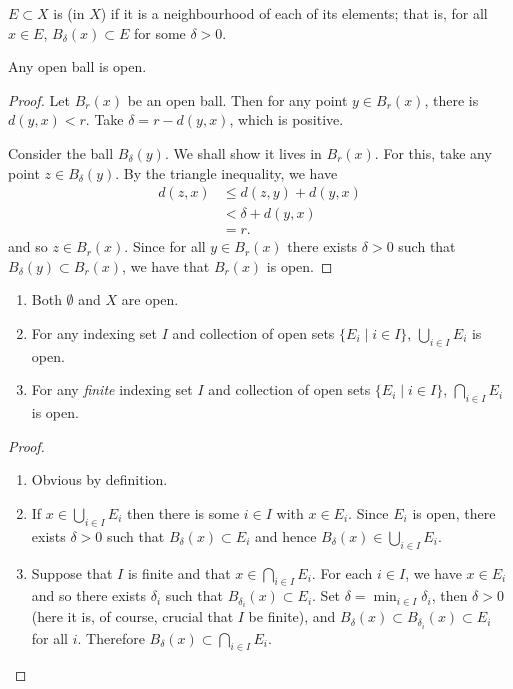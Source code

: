 \begin{definition}
$E\subset X$ is  (in $X$) if it is a neighbourhood of each of its elements; that is, for all $x\in E$, $B_\delta(x)\subset E$ for some $\delta>0$.
\end{definition}

\begin{proposition}
Any open ball is open.
\end{proposition}

\begin{proof}
Let $B_r(x)$ be an open ball. Then for any point $y\in B_r(x)$, there is $d(y,x)<r$. Take $\delta=r-d(y,x)$, which is positive.

Consider the ball $B_\delta(y)$. We shall show it lives in $B_r(x)$. For this, take any point $z\in B_\delta(y)$. By the triangle inequality, we have
\begin{align*}
d(z,x)&\le d(z,y)+d(y,x)\\
&<\delta+d(y,x)\\
&=r.
\end{align*}
and so $z\in B_r(x)$. Since for all $y\in B_r(x)$ there exists $\delta>0$ such that $B_\delta(y)\subset B_r(x)$, we have that $B_r(x)$ is open.
\end{proof}

\begin{proposition}\label{prop:open-set-properties}
\begin{enumerate}[label=(\roman*)]
\item Both $\emptyset$ and $X$ are open.
\item For any indexing set $I$ and collection of open sets $\{E_i\mid i\in I\}$, $\bigcup_{i\in I}E_i$ is open.
\item For any \emph{finite} indexing set $I$ and collection of open sets $\{E_i\mid i\in I\}$, $\bigcap_{i\in I}E_i$ is open.
\end{enumerate}
\end{proposition}

\begin{proof} \
\begin{enumerate}[label=(\roman*)]
\item Obvious by definition.
\item If $ x\in\bigcup_{i\in I}E_i$ then there is some $i\in I$ with $x\in E_i$. Since $E_i$ is open, there exists $\delta>0$ such that $B_\delta(x)\subset E_i$ and hence $ B_\delta(x)\in\bigcup_{i\in I}E_i$.
\item Suppose that $I$ is finite and that $ x\in\bigcap_{i\in I}E_i$. For each $i\in I$, we have $x\in E_i$ and so there exists $\delta_i$ such that $B_{\delta_i}(x)\subset E_i$. Set $\delta=\min_{i\in I}\delta_i$, then $\delta>0$ (here it is, of course, crucial that $I$ be finite), and $B_\delta(x)\subset B_{\delta_i}(x)\subset E_i$ for all $i$. Therefore $ B_\delta(x)\subset\bigcap_{i\in I}E_i$.
\end{enumerate}
\end{proof}

